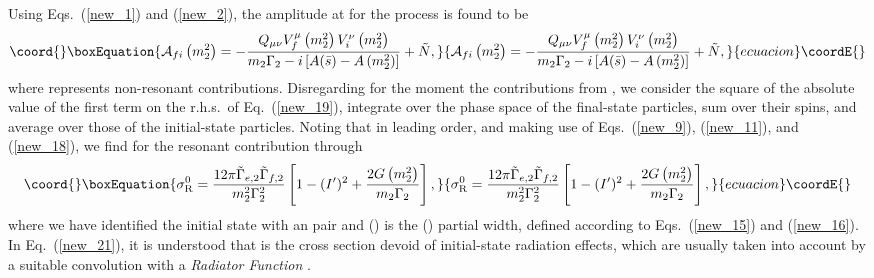 \documentclass[a4paper,12pt]{article}
\begin{document}
Using Eqs.~(\ref{new_1}) and (\ref{new_2}), the amplitude at \coordHE{} for the
process \coordHE{} is found to be
\begin{equation}\coord{}\boxEquation{
\label{new_19}
{\cal A}_{fi}\left(m_2^2\right)
=-\frac{Q_{\mu\nu}V_f^\mu\left(m_2^2\right)V_i^\nu\left(m_2^2\right)}
{m_2\Gamma_2-i\left[A(\bar s)-A\left(m_2^2\right)\right]}
+\tilde N,
}{
{\cal A}_{fi}\left(m_2^2\right)
=-\frac{Q_{\mu\nu}V_f^\mu\left(m_2^2\right)V_i^\nu\left(m_2^2\right)}
{m_2\Gamma_2-i\left[A(\bar s)-A\left(m_2^2\right)\right]}
+\tilde N,
}{ecuacion}\coordE{}\end{equation}
where \coordHE{} represents non-resonant contributions.
Disregarding for the moment the contributions from \coordHE{}, we consider the
square of the absolute value of the first term on the r.h.s.\ of
Eq.~(\ref{new_19}),
integrate over the phase space of the final-state particles, sum over their
spins, and average over those of the initial-state particles.
Noting that
\coordHE{} in leading order, and making
use of Eqs.~(\ref{new_9}), (\ref{new_11}), and (\ref{new_18}), we find for the
resonant contribution through \coordHE{} 
\begin{equation}\coord{}\boxEquation{
\label{new_21}
\sigma_{\rm R}^0=\frac{12\pi\tilde\Gamma_{e,2}\tilde\Gamma_{f,2}}
{m_2^2\Gamma^2_2}
\left[1-(I^\prime)^2+\frac{2G\left(m_2^2\right)}{m_2\Gamma_2}\right],
}{
\sigma_{\rm R}^0=\frac{12\pi\tilde\Gamma_{e,2}\tilde\Gamma_{f,2}}
{m_2^2\Gamma^2_2}
\left[1-(I^\prime)^2+\frac{2G\left(m_2^2\right)}{m_2\Gamma_2}\right],
}{ecuacion}\coordE{}\end{equation}
where we have identified the initial state with an \coordHE{} pair and 
\coordHE{} (\coordHE{}) is the \coordHE{}
(\coordHE{}) partial width, defined according to
Eqs.~(\ref{new_15}) and (\ref{new_16}).
In Eq.~(\ref{new_21}), it is understood that \coordHE{} is the cross section
devoid of initial-state radiation effects, which are usually taken into
account by a suitable convolution with a {\it Radiator Function} \cite{pdg}. 
\end{document}
